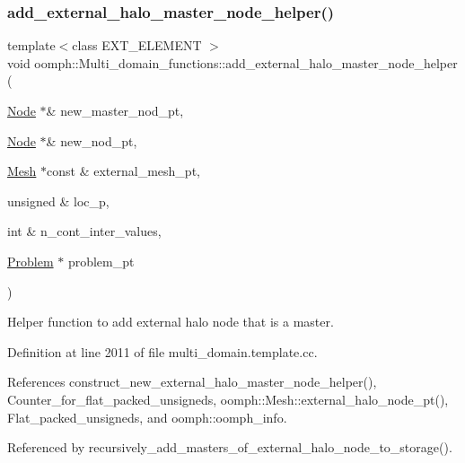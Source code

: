 \subsubsection{\texorpdfstring{add\+\_\+external\+\_\+halo\+\_\+master\+\_\+node\+\_\+helper()}{add\_external\_halo\_master\_node\_helper()}}
{\footnotesize\ttfamily template$<$class E\+X\+T\+\_\+\+E\+L\+E\+M\+E\+NT $>$ \\
void oomph\+::\+Multi\+\_\+domain\+\_\+functions\+::add\+\_\+external\+\_\+halo\+\_\+master\+\_\+node\+\_\+helper (\begin{DoxyParamCaption}\item[{\hyperlink{classoomph_1_1Node}{Node} $\ast$\&}]{new\+\_\+master\+\_\+nod\+\_\+pt,  }\item[{\hyperlink{classoomph_1_1Node}{Node} $\ast$\&}]{new\+\_\+nod\+\_\+pt,  }\item[{\hyperlink{classoomph_1_1Mesh}{Mesh} $\ast$const \&}]{external\+\_\+mesh\+\_\+pt,  }\item[{unsigned \&}]{loc\+\_\+p,  }\item[{int \&}]{n\+\_\+cont\+\_\+inter\+\_\+values,  }\item[{\hyperlink{classoomph_1_1Problem}{Problem} $\ast$}]{problem\+\_\+pt }\end{DoxyParamCaption})}



Helper function to add external halo node that is a master. 



Definition at line 2011 of file multi\+\_\+domain.\+template.\+cc.



References construct\+\_\+new\+\_\+external\+\_\+halo\+\_\+master\+\_\+node\+\_\+helper(), Counter\+\_\+for\+\_\+flat\+\_\+packed\+\_\+unsigneds, oomph\+::\+Mesh\+::external\+\_\+halo\+\_\+node\+\_\+pt(), Flat\+\_\+packed\+\_\+unsigneds, and oomph\+::oomph\+\_\+info.



Referenced by recursively\+\_\+add\+\_\+masters\+\_\+of\+\_\+external\+\_\+halo\+\_\+node\+\_\+to\+\_\+storage().

\mbox{\label{namespaceoomph_1_1Multi__domain__functions_abbec3c28e0cdbe77c6ce3c9021528247}} 
